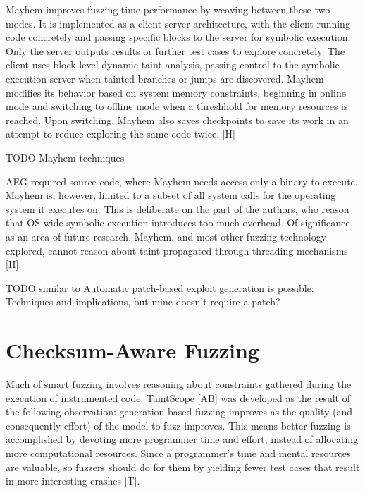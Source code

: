 \documentclass[11pt,expanded,copyright]{fsuthesis}
\begin{document}
Mayhem improves fuzzing time performance by weaving between these two modes. It is implemented as a client-server architecture, with the client running code concretely and passing specific blocks to the server for symbolic execution. Only the server outputs results or further test cases to explore concretely. The client uses block-level dynamic taint analysis, passing control to the symbolic execution server when tainted branches or jumps are discovered. Mayhem modifies its behavior based on system memory constraints, beginning in online mode and switching to offline mode when a threshhold for memory resources is reached. Upon switching, Mayhem also saves checkpoints to save its work in an attempt to reduce exploring the same code twice. [H]

TODO Mayhem techniques

AEG required source code, where Mayhem needs access only a binary to execute. Mayhem is, however, limited to a subset of all system calls for the operating system it executes on. This is deliberate on the part of the authors, who reason that OS-wide symbolic execution introduces too much overhead. Of significance as an area of future research, Mayhem, and most other fuzzing technology explored, cannot reason about taint propagated through threading mechanisms [H].


TODO similar to Automatic patch-based exploit generation is possible: Techniques and
implications, but mine doesn't require a patch?



\section{Checksum-Aware Fuzzing}

Much of smart fuzzing involves reasoning about constraints gathered during the execution of instrumented code. TaintScope [AB] was developed as the result of the following observation: generation-based fuzzing improves as the quality (and consequently effort) of the model to fuzz improves. This means better fuzzing is accomplished by devoting more programmer time and effort, instead of allocating more computational resources. Since a programmer's time and mental resources are valuable, so fuzzers should do for them by yielding fewer test cases that result in more interesting crashes [T].
\end{document}
